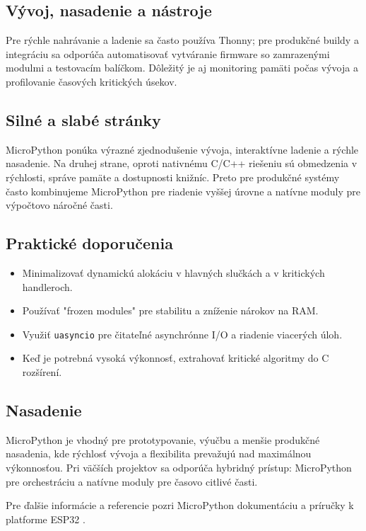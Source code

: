 \subsection*{Vývoj, nasadenie a nástroje}
Pre rýchle nahrávanie a ladenie sa často používa Thonny; pre produkčné buildy a integráciu sa odporúča automatisovať vytváranie firmware so zamrazenými modulmi a testovacím balíčkom. Dôležitý je aj monitoring pamäti počas vývoja a profilovanie časových kritických úsekov.

\subsection*{Silné a slabé stránky}
MicroPython ponúka výrazné zjednodušenie vývoja, interaktívne ladenie a rýchle nasadenie. Na druhej strane, oproti nativnému C/C++ riešeniu sú obmedzenia v rýchlosti, správe pamäte a dostupnosti knižníc. Preto pre produkčné systémy často kombinujeme MicroPython pre riadenie vyššej úrovne a natívne moduly pre výpočtovo náročné časti.

\subsection*{Praktické doporučenia}
\begin{itemize}
	\item Minimalizovať dynamickú alokáciu v hlavných slučkách a v kritických handleroch.
	\item Používať "frozen modules" pre stabilitu a zníženie nárokov na RAM.
	\item Využiť \texttt{uasyncio} pre čitateľné asynchrónne I/O a riadenie viacerých úloh.
	\item Keď je potrebná vysoká výkonnosť, extrahovať kritické algoritmy do C rozšírení.
\end{itemize}

\subsection*{Nasadenie}
MicroPython je vhodný pre prototypovanie, výučbu a menšie produkčné nasadenia, kde rýchlosť vývoja a flexibilita prevažujú nad maximálnou výkonnosťou. Pri väčších projektov sa odporúča hybridný prístup: MicroPython pre orchestráciu a natívne moduly pre časovo citlivé časti.

Pre ďalšie informácie a referencie pozri MicroPython dokumentáciu a príručky k platforme ESP32 \cite{micropython_docs}.
